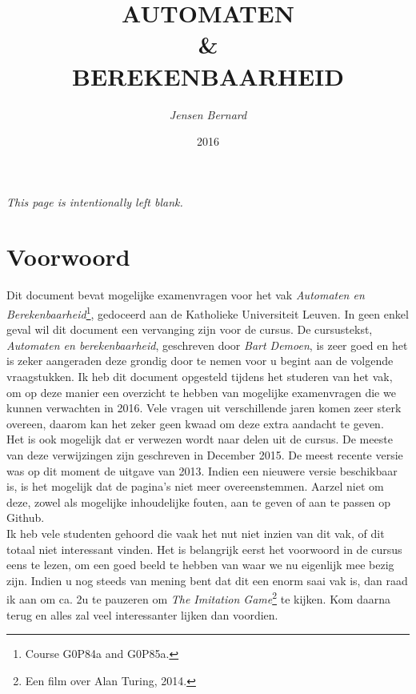 \documentclass[10pt,a4paper]{article}
\title{AUTOMATEN \\ \& \\ BEREKENBAARHEID}
\author{\emph{Jensen Bernard}}
\date{2016}
\begin{document}
\sloppy

\clearpage
\thispagestyle{empty}
\maketitle
\newpage

\begin{center}
	\emph{This page is intentionally left blank.}
\end{center}

\newpage
\section*{Voorwoord}

Dit document bevat mogelijke examenvragen voor het vak \emph{Automaten en Berekenbaarheid}\footnote{Course G0P84a and G0P85a.}, gedoceerd aan de Katholieke Universiteit Leuven. In geen enkel geval wil dit document een vervanging zijn voor de cursus. De cursustekst, \emph{Automaten en berekenbaarheid}, geschreven door \emph{Bart Demoen}, is zeer goed en het is zeker aangeraden deze grondig door te nemen voor u begint aan de volgende vraagstukken.
Ik heb dit document opgesteld tijdens het studeren van het vak, om op deze manier een overzicht te hebben van mogelijke examenvragen die we kunnen verwachten in 2016. Vele vragen uit verschillende jaren komen zeer sterk overeen, daarom kan het zeker geen kwaad om deze extra aandacht te geven.
\\

Het is ook mogelijk dat er verwezen wordt naar delen uit de cursus. De meeste van deze verwijzingen zijn geschreven in December 2015. De meest recente versie was op dit moment de uitgave van 2013. Indien een nieuwere versie beschikbaar is, is het mogelijk dat de pagina's niet meer overeenstemmen. Aarzel niet om deze, zowel als mogelijke inhoudelijke fouten, aan te geven of aan te passen op Github.
\\

Ik heb vele studenten gehoord die vaak het nut niet inzien van dit vak, of dit totaal niet interessant vinden. Het is belangrijk eerst het voorwoord in de cursus eens te lezen, om een goed beeld te hebben van waar we nu eigenlijk mee bezig zijn. Indien u nog steeds van mening bent dat dit een enorm saai vak is, dan raad ik aan om ca. 2u te pauzeren om \emph{The Imitation Game}\footnote{Een film over Alan Turing, 2014.} te kijken. Kom daarna terug en alles zal veel interessanter lijken dan voordien.
\\
\end{document}
